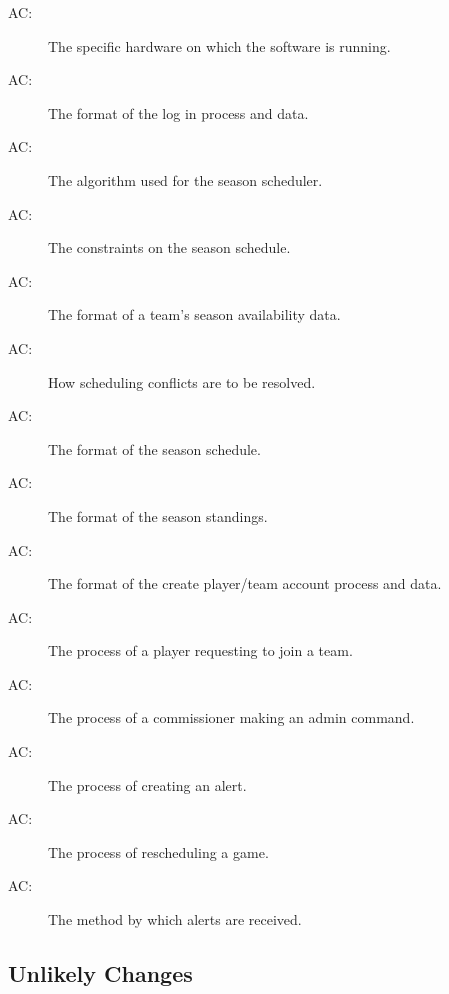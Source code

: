 \documentclass[12pt, titlepage]{article}
\newcounter{acnum}
\newcommand{\actheacnum}{AC\theacnum}
\begin{document}
\begin{description}
  \item[ \actheacnum \label{acHardware}:] The specific
  hardware on which the software is running.
  \item[ \actheacnum \label{acLogIn}:] The format of the
  log in process and data.
  \item[ \actheacnum \label{acSched}:] The algorithm
  used for the season scheduler.
  \item[ \actheacnum \label{acSchedConstraints}:] The
  constraints on the season schedule.
  \item[ \actheacnum \label{acAvailability}:] The format
  of a team's season availability data.
  \item[ \actheacnum \label{acSchedConflicts}:] How
  scheduling conflicts are to be resolved.
  \item[ \actheacnum \label{acSchedFormat}:] The format
  of the season schedule.
  \item[ \actheacnum \label{acStandFormat}:] The format
  of the season standings.
  \item[ \actheacnum \label{acCreateAccount}:] The
  format of the create player/team account process and data.
  \item[ \actheacnum \label{acJoinRequest}:] The process
  of a player requesting to join a team.
  \item[ \actheacnum \label{acAdmin}:] The process of a
  commissioner making an admin command.
  \item[ \actheacnum \label{acAlertSend}:] The process
  of creating an alert.
  \item[ \actheacnum \label{acReschedule}:] The process
  of rescheduling a game.
  \item[ \actheacnum \label{acAlertReceive}:] The method
  by which alerts are received.
\end{description}


\subsection{Unlikely Changes} \label{SecUchange}
\end{document}
